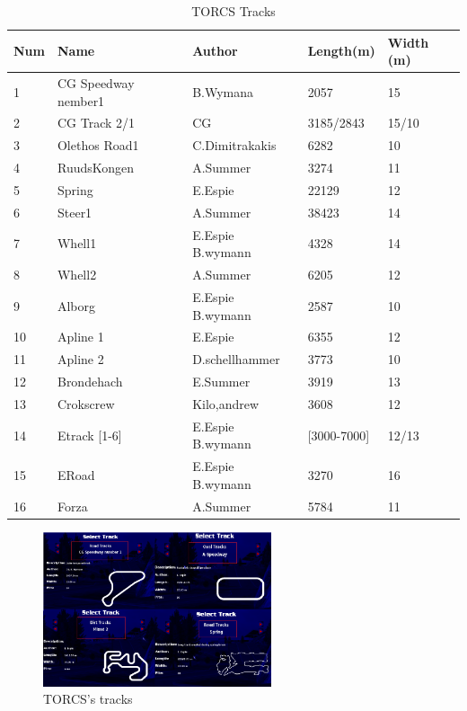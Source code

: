 \documentclass{llncs}
\begin{document}
\begin{table}[h!]
	
	\caption{TORCS Tracks }
	\label{CATRA}			
	\begin{tabular}{ |p{1cm}|p{3cm}|p{3 cm}|p{2 cm}|p{2 cm}|}
		{ \textbf{Num} }&	
		{ \textbf{Name} }&
		{ \textbf{Author}}&  
		{ \textbf{Length(m)} } &
		{ \textbf{Width (m)} }
		\\
		\hline
		1 & CG Speedway nember1 & B.Wymana & 2057 & 15 
		\\
		\hline
		2 & CG Track 2/1 & CG & 3185/2843 & 15/10 
		\\
		\hline
		3 & Olethos Road1 & C.Dimitrakakis & 6282 & 10 
		\\
		\hline
		4 & RuudsKongen & A.Summer & 3274 & 11
		\\
		\hline
		5 & Spring & E.Espie & 22129 & 12
		\\
		\hline
		6 & Steer1 & A.Summer & 38423 & 14
		\\
		\hline
		7 & Whell1 & E.Espie B.wymann & 4328 & 14
		\\
		\hline	
		8 & Whell2 & A.Summer & 6205 & 12
		\\
		\hline	
		9 & Alborg & E.Espie B.wymann & 2587 & 10
		\\
		\hline
		10 & Apline 1 & E.Espie  & 6355 & 12
		\\
		\hline
		11 & Apline 2 & D.schellhammer & 3773 & 10
		\\
		\hline
		12 & Brondehach & E.Summer & 3919 & 13
		\\
		\hline
		13 & Crokscrew & Kilo,andrew & 3608 & 12
		\\
		\hline
		14 & Etrack [1-6] & E.Espie B.wymann& [3000-7000] & 12/13
		\\
		\hline
		15 & ERoad  & E.Espie B.wymann & 3270 & 16
		\\
		\hline	
		16 & Forza  & A.Summer & 5784 & 11
		\\
		\hline   		    	
	\end{tabular} 
	
\end{table}

\begin{figure}[ h!]
	\centering
	\includegraphics[width=0.6\textwidth]{fig/trackexp.PNG}
	\begin{minipage}{10cm}
		\centering
		\caption{\footnotesize TORCS's tracks}
		\label{trackexp}
	\end{minipage} 
 
	
\end{figure}
\newpage
\end{document}

